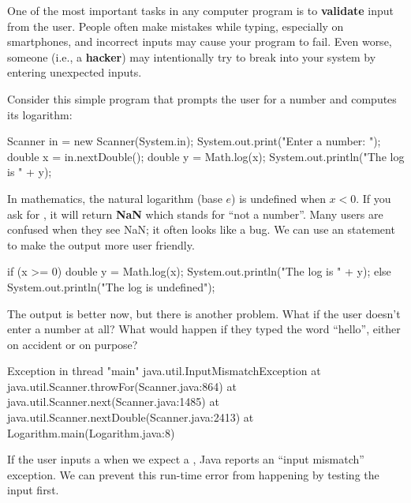
One of the most important tasks in any computer program is to {\bf validate} input from the user.
People often make mistakes while typing, especially on smartphones, and incorrect inputs may cause your program to fail.
Even worse, someone (i.e., a {\bf hacker}) may intentionally try to break into your system by entering unexpected inputs.

Consider this simple program that prompts the user for a number and computes its logarithm:

\begin{code}
Scanner in = new Scanner(System.in);
System.out.print("Enter a number: ");
double x = in.nextDouble();
double y = Math.log(x);
System.out.println("The log is " + y);
\end{code}

In mathematics, the natural logarithm (base $e$) is undefined when $x < 0$.
If you ask for , it will return {\bf NaN} which stands for ``not a number''.
Many users are confused when they see NaN; it often looks like a bug.
We can use an  statement to make the output more user friendly.

\begin{code}
if (x >= 0) {
    double y = Math.log(x);
    System.out.println("The log is " + y);
} else {
    System.out.println("The log is undefined");
}
\end{code}

The output is better now, but there is another problem.
What if the user doesn't enter a number at all?
What would happen if they typed the word ``hello'', either on accident or on purpose?


\begin{small}
\begin{stdout}
Exception in thread "main" java.util.InputMismatchException
    at java.util.Scanner.throwFor(Scanner.java:864)
    at java.util.Scanner.next(Scanner.java:1485)
    at java.util.Scanner.nextDouble(Scanner.java:2413)
    at Logarithm.main(Logarithm.java:8)
\end{stdout}
\end{small}


If the user inputs a  when we expect a , Java reports an ``input mismatch'' exception.
We can prevent this run-time error from happening by testing the input first.

